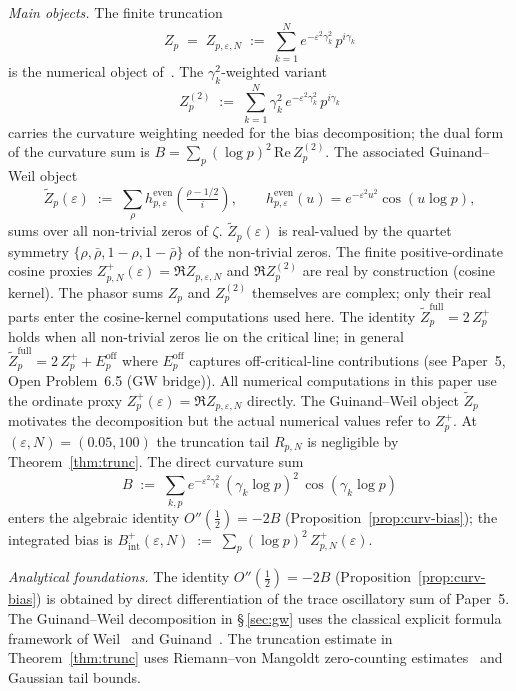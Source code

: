 \documentclass[11pt]{article}
\begin{document}
\medskip
\emph{Main objects.}
The finite truncation
\[
Z_p \;=\; Z_{p,\varepsilon,N} \;:=\;
\sum_{k=1}^{N} e^{-\varepsilon^2\gamma_k^2}\,p^{i\gamma_k}
\]
is the numerical object of~\cite{Paper4,Paper5}.
The $\gamma_k^2$-weighted variant
\[
Z_p^{(2)} \;:=\; \sum_{k=1}^{N} \gamma_k^2\,
e^{-\varepsilon^2\gamma_k^2}\,p^{i\gamma_k}
\]
carries the curvature weighting needed for the bias
decomposition; the dual form of the curvature sum is
$B = \sum_p (\log p)^2\,\mathrm{Re}\,Z_p^{(2)}$.
The associated Guinand--Weil object
\[
\widetilde Z_p(\varepsilon) \;:=\; \sum_{\rho}
h^{\mathrm{even}}_{p,\varepsilon}\!\left(\tfrac{\rho-1/2}{i}\right),
\qquad
h^{\mathrm{even}}_{p,\varepsilon}(u)=e^{-\varepsilon^2 u^2}\cos(u\log p),
\]
sums over all non-trivial zeros of $\zeta$.
$\widetilde Z_p(\varepsilon)$ is real-valued by the quartet symmetry
$\{\rho,\bar\rho,1-\rho,1-\bar\rho\}$ of the non-trivial zeros.
The finite positive-ordinate cosine proxies
$Z_{p,N}^+(\varepsilon)=\Re Z_{p,\varepsilon,N}$ and $\Re Z_p^{(2)}$
are real by construction (cosine kernel).
The phasor sums $Z_p$ and $Z_p^{(2)}$ themselves are complex;
only their real parts enter the cosine-kernel computations used here.
The identity $\widetilde Z_p^{\mathrm{full}} = 2\,Z_p^{+}$ holds when
all non-trivial zeros lie on the critical line; in general
$\widetilde Z_p^{\mathrm{full}} = 2\,Z_p^{+} + E_p^{\mathrm{off}}$
where $E_p^{\mathrm{off}}$ captures off-critical-line contributions
(see Paper~5, Open Problem~6.5 (GW bridge)).
All numerical computations in this paper use the ordinate proxy
$Z_p^{+}(\varepsilon) = \Re Z_{p,\varepsilon,N}$ directly.
The Guinand--Weil object $\widetilde Z_p$ motivates the decomposition
but the actual numerical values refer to $Z_p^{+}$.
At $(\varepsilon,N)=(0.05,100)$ the truncation tail $R_{p,N}$
is negligible by Theorem~\ref{thm:trunc}.
The direct curvature sum
\[
B \;:=\; \sum_{k,p} e^{-\varepsilon^2\gamma_k^2}\,
(\gamma_k\log p)^2\,\cos(\gamma_k\log p)
\]
enters the algebraic identity $O''(\tfrac12)=-2B$
(Proposition~\ref{prop:curv-bias}); the integrated bias is
$B_{\mathrm{int}}^+(\varepsilon,N)\;:=\;\sum_p (\log p)^2\,Z_{p,N}^+(\varepsilon)$.

\medskip
\emph{Analytical foundations.}
The identity $O''(\tfrac12)=-2B$ (Proposition~\ref{prop:curv-bias})
is obtained by direct differentiation of the trace oscillatory sum
of Paper~5.
The Guinand--Weil decomposition in \S\,\ref{sec:gw} uses the classical
explicit formula framework of Weil~\cite{Weil} and Guinand~\cite{Guinand}.
The truncation estimate in Theorem~\ref{thm:trunc} uses
Riemann--von Mangoldt zero-counting
estimates~\cite[Thm.\,5.8]{IwaniecKowalski04} and Gaussian tail bounds.
\end{document}
